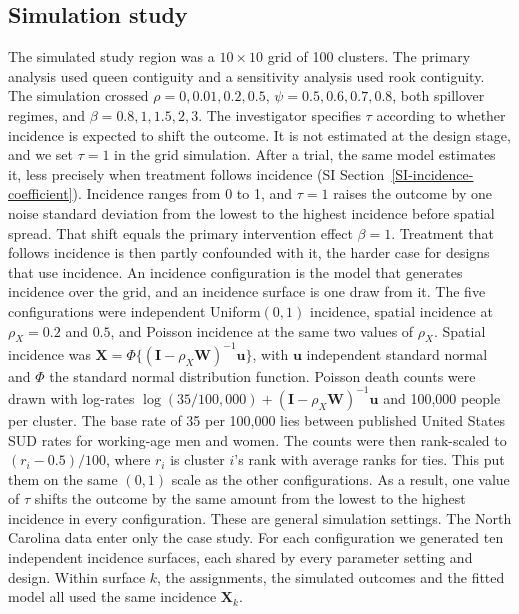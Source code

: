 \documentclass[Afour,sagev,times]{sagej}
\begin{document}
\subsection{Simulation study}
The simulated study region was a $10\times10$ grid of 100 clusters. The primary analysis used queen contiguity and a sensitivity analysis used rook contiguity.\cite{bivand_applied_2008} The simulation crossed $\rho=0,0.01,0.2,0.5$, $\psi=0.5,0.6,0.7,0.8$, both spillover regimes, and $\beta=0.8,1,1.5,2,3$. The investigator specifies $\tau$ according to whether incidence is expected to shift the outcome. It is not estimated at the design stage, and we set $\tau=1$ in the grid simulation. After a trial, the same model estimates it, less precisely when treatment follows incidence (SI Section~\ref{SI-incidence-coefficient}). Incidence ranges from 0 to 1, and $\tau=1$ raises the outcome by one noise standard deviation from the lowest to the highest incidence before spatial spread. That shift equals the primary intervention effect $\beta=1$. Treatment that follows incidence is then partly confounded with it, the harder case for designs that use incidence. An incidence configuration is the model that generates incidence over the grid, and an incidence surface is one draw from it. The five configurations were independent Uniform$(0,1)$ incidence, spatial incidence at $\rho_X=0.2$ and $0.5$, and Poisson incidence at the same two values of $\rho_X$. Spatial incidence was $\mathbf{X}=\Phi\{(\mathbf{I}-\rho_X\mathbf{W})^{-1}\mathbf{u}\}$, with $\mathbf{u}$ independent standard normal and $\Phi$ the standard normal distribution function. Poisson death counts were drawn with log-rates $\log(35/100{,}000)+(\mathbf{I}-\rho_X\mathbf{W})^{-1}\mathbf{u}$ and 100,000 people per cluster. The base rate of 35 per 100,000 lies between published United States SUD rates for working-age men and women.\cite{mirzaei_years_2019} The counts were then rank-scaled to $(r_i-0.5)/100$, where $r_i$ is cluster $i$'s rank with average ranks for ties. This put them on the same $(0,1)$ scale as the other configurations. As a result, one value of $\tau$ shifts the outcome by the same amount from the lowest to the highest incidence in every configuration. These are general simulation settings. The North Carolina data enter only the case study. For each configuration we generated ten independent incidence surfaces, each shared by every parameter setting and design. Within surface $k$, the assignments, the simulated outcomes and the fitted model all used the same incidence $\mathbf{X}_k$.
\end{document}

